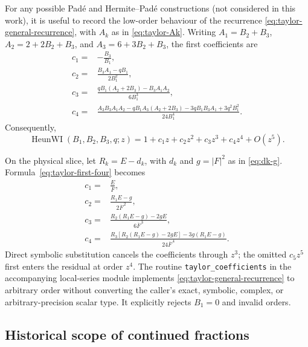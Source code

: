 \documentclass[11pt]{article}
\theoremstyle{remark}
\begin{document}
For any possible Pad\'e and Hermite--Pad\'e constructions (not considered
in this work), it is useful to record the low-order behaviour of the
recurrence
\eqref{eq:taylor-general-recurrence}, with \(A_k\) as in
\eqref{eq:taylor-Ak}.  Writing \(A_1=B_2+B_3\), \(A_2=2+2B_2+B_3\), and
\(A_3=6+3B_2+B_3\), the first coefficients are
\begin{align}
 c_1={}&-\frac{B_3}{B_1},\nonumber\\
 c_2={}&\frac{B_3A_1-qB_1}{2B_1^2},\nonumber\\
 c_3={}&\frac{qB_1(A_2+2B_3)-B_3A_1A_2}{6B_1^3},\nonumber\\
 c_4={}&\frac{A_3B_3A_1A_2-qB_1A_3(A_2+2B_3)
 -3qB_1B_3A_1+3q^2B_1^2}{24B_1^4}.
 \label{eq:taylor-first-four}
\end{align}
Consequently,
\begin{equation}
 \operatorname{HeunWI}(B_1,B_2,B_3,q;z)
 =1+c_1z+c_2z^2+c_3z^3+c_4z^4+O(z^5).
 \label{eq:heunwi-taylor-four}
\end{equation}

On the physical slice, let \(R_k=E-d_k\), with \(d_k\) and \(g=|F|^2\)
as in \eqref{eq:dk-g}.  Formula~\eqref{eq:taylor-first-four} becomes
\begin{align}
 c_1={}&\frac{E}{\overline F},\nonumber\\
 c_2={}&\frac{R_1E-g}{2\overline F^{\,2}},\nonumber\\
 c_3={}&\frac{R_2(R_1E-g)-2gE}{6\overline F^{\,3}},\nonumber\\
 c_4={}&\frac{R_3[R_2(R_1E-g)-2gE]-3g(R_1E-g)}
 {24\overline F^{\,4}}.
 \label{eq:taylor-physical-four}
\end{align}
Direct symbolic substitution cancels the coefficients through \(z^3\);
the omitted \(c_5z^5\) first enters the residual at order \(z^4\).
The routine \texttt{taylor\_coefficients} in the accompanying local-series
module implements
\eqref{eq:taylor-general-recurrence} to arbitrary order without converting
the caller's exact, symbolic, complex, or arbitrary-precision scalar type.
It explicitly rejects \(B_1=0\) and invalid orders.

\subsection{Historical scope of continued fractions}
\end{document}
